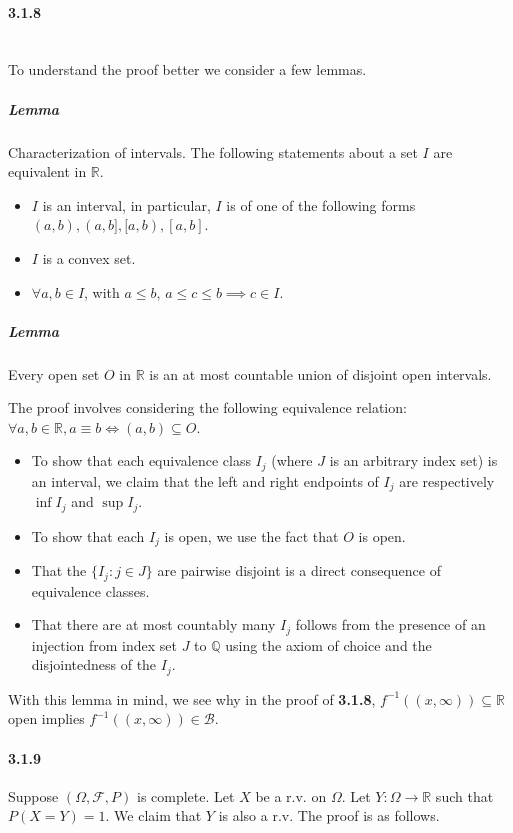 \documentclass[a4paper]{article}
\newcommand{\alg}[0]{\mathcal{F}} %
\newcommand{\borel}[0]{\mathcal{B}} %
\newcommand{\triple}[0]{(\Omega, \alg, P)} %
\newcommand{\real}[0]{\mathbb{R}} %
\newcommand{\rational}[0]{\mathbb{Q}} %
\begin{document}
\paragraph{3.1.8}\mbox{}\\
To understand the proof better we consider a few lemmas.

\subparagraph{Lemma} Characterization of intervals. The following statements about a set $I$ are equivalent in $\real$.
\begin{itemize}
	\item $I$ is an interval, in particular, $I$ is of one of the following forms $(a,b), (a,b], [a,b), [a,b]$.
	\item $I$ is a convex set.
	\item $\forall a,b\in I$, with $a\leq b$, $a\leq c\leq b\implies c\in I$. 
\end{itemize}

\subparagraph{Lemma} Every open set $O$ in $\real$ is an at most countable union of disjoint open intervals.

The proof involves considering the following equivalence relation: $\forall a,b\in\real, a\equiv b \iff (a,b)\subseteq O$. 
\begin{itemize}
	\item To show that each equivalence class $I_j$ (where $J$ is an arbitrary index set) is an interval, we claim that the left and right endpoints of $I_j$ are respectively $\inf I_j$ and $\sup I_j$.
	\item To show that each $I_j$ is open, we use the fact that $O$ is open.
	\item That the $\{I_j : j\in J\}$ are pairwise disjoint is a direct consequence of equivalence classes.
	\item That there are at most countably many $I_j$ follows from the presence of an injection from index set $J$ to $\rational$ using the axiom of choice and the disjointedness of the $I_j$.
\end{itemize}

With this lemma in mind, we see why in the proof of \textbf{3.1.8}, $f^{-1}((x,\infty))\subseteq\real$ open implies $f^{-1}((x,\infty))\in\borel$.

\paragraph{3.1.9} Suppose $\triple$ is complete. Let $X$ be a r.v. on $\Omega$. Let $Y: \Omega\rightarrow\real$ such that $P(X=Y)=1$. We claim that $Y$ is also a r.v. The proof is as follows.
\end{document}
